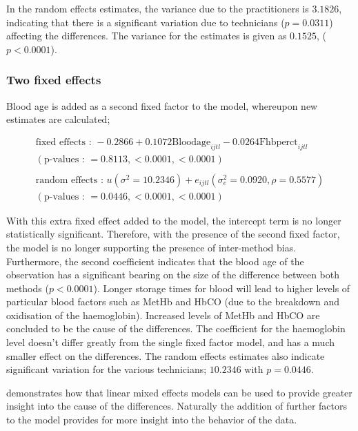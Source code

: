 \documentclass[12pt, a4paper]{report}
\theoremstyle{plain}
\theoremstyle{definition}
\theoremstyle{remark}
\begin{document}
In the random effects estimates, the variance due to the
practitioners is $3.1826$, indicating that there is a significant
variation due to technicians ($p=0.0311$) affecting the
differences. The variance for the estimates is given as $0.1525$,
($p<0.0001$).

\subsubsection{Two fixed effects}
Blood age is added as a second fixed factor to the model,
whereupon new estimates are calculated;
\begin{framed}
\begin{eqnarray}
\mbox{fixed effects :   } -0.2866 + 0.1072 \mbox{Bloodage}_{ijtl}
- 0.0264\mbox{Fhbperct}_{ijtl}\nonumber\\
( \mbox{p-values :   } = 0.8113, <0.0001, <0.0001)\nonumber\\\nonumber\\
\mbox{random effects :   } u(\sigma^{2}=10.2346) + e_{ijtl}
(\sigma^{2}_{e}=0.0920, \rho= 0.5577) \nonumber\\
(\mbox{p-values :   } = 0.0446, <0.0001, <0.0001)
\end{eqnarray}
\end{framed}


With this extra fixed effect added to the model, the intercept
term is no longer statistically significant. Therefore, with the
presence of the second fixed factor, the model is no longer
supporting the presence of inter-method bias. Furthermore, the
second coefficient indicates that the blood age of the observation
has a significant bearing on the size of the difference between
both methods ($p <0.0001$). Longer storage times for blood will
lead to higher levels of particular blood factors such as MetHb
and HbCO (due to the breakdown and oxidisation of the
haemoglobin). Increased levels of MetHb and HbCO are concluded to
be the cause of the differences. The coefficient for the
haemoglobin level doesn't differ greatly from the single fixed
factor model, and has a much smaller effect on the differences.
The random effects estimates also indicate significant variation
for the various technicians; $10.2346$ with $p=0.0446$.

\citet{LaiShiao} demonstrates how that linear mixed effects models
can be used to provide greater insight into the cause of the
differences. Naturally the addition of further factors to the
model provides for more insight into the behavior of the data.
\end{document}
